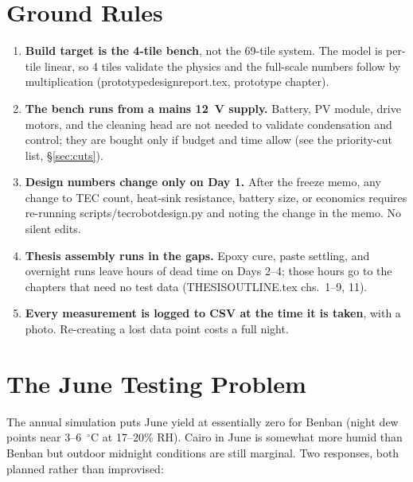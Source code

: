 \documentclass[11pt,a4paper]{article}
\newcommand{\f}[1]{{\ttfamily\def\_{\textunderscore\allowbreak}#1}}
\begin{document}
\section{Ground Rules}
\begin{enumerate}[leftmargin=*]
  \item \textbf{Build target is the 4-tile bench}, not the 69-tile system. The
        model is per-tile linear, so 4 tiles validate the physics and the
        full-scale numbers follow by multiplication
        (\f{prototype\_design\_report.tex}, prototype chapter).
  \item \textbf{The bench runs from a mains 12~V supply.} Battery, PV module,
        drive motors, and the cleaning head are not needed to validate
        condensation and control; they are bought only if budget and time
        allow (see the priority-cut list, \S\ref{sec:cuts}).
  \item \textbf{Design numbers change only on Day 1.} After the freeze memo,
        any change to TEC count, heat-sink resistance, battery size, or
        economics requires re-running \f{scripts/tec\_robot\_design.py} and
        noting the change in the memo. No silent edits.
  \item \textbf{Thesis assembly runs in the gaps.} Epoxy cure, paste settling,
        and overnight runs leave hours of dead time on Days 2--4; those hours
        go to the chapters that need no test data
        (\f{THESIS\_OUTLINE.tex} chs.~1--9, 11).
  \item \textbf{Every measurement is logged to CSV at the time it is taken},
        with a photo. Re-creating a lost data point costs a full night.
\end{enumerate}

\section{The June Testing Problem}
\label{sec:june}
The annual simulation puts June yield at essentially zero for Benban (night
dew points near 3--6~$^{\circ}$C at 17--20\% RH). Cairo in June is somewhat
more humid than Benban but outdoor midnight conditions are still marginal.
Two responses, both planned rather than improvised:
\end{document}
